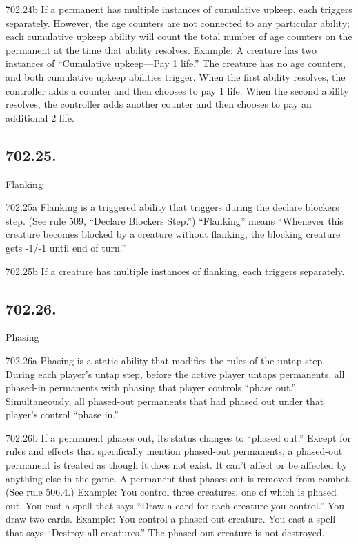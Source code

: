 702.24b If a permanent has multiple instances of cumulative upkeep, each triggers separately. However, the age counters are not connected to any particular ability; each cumulative upkeep ability will count the total number of age counters on the permanent at the time that ability resolves.
Example: A creature has two instances of “Cumulative upkeep—Pay 1 life.” The creature has no age counters, and both cumulative upkeep abilities trigger. When the first ability resolves, the controller adds a counter and then chooses to pay 1 life. When the second ability resolves, the controller adds another counter and then chooses to pay an additional 2 life.

\subsection*{702.25.}
Flanking

702.25a Flanking is a triggered ability that triggers during the declare blockers step. (See rule 509, “Declare Blockers Step.”) “Flanking” means “Whenever this creature becomes blocked by a creature without flanking, the blocking creature gets -1/-1 until end of turn.”

702.25b If a creature has multiple instances of flanking, each triggers separately.

\subsection*{702.26.}
Phasing

702.26a Phasing is a static ability that modifies the rules of the untap step. During each player’s untap step, before the active player untaps permanents, all phased-in permanents with phasing that player controls “phase out.” Simultaneously, all phased-out permanents that had phased out under that player’s control “phase in.”

702.26b If a permanent phases out, its status changes to “phased out.” Except for rules and effects that specifically mention phased-out permanents, a phased-out permanent is treated as though it does not exist. It can’t affect or be affected by anything else in the game. A permanent that phases out is removed from combat. (See rule 506.4.)
Example: You control three creatures, one of which is phased out. You cast a spell that says “Draw a card for each creature you control.” You draw two cards.
Example: You control a phased-out creature. You cast a spell that says “Destroy all creatures.” The phased-out creature is not destroyed.

